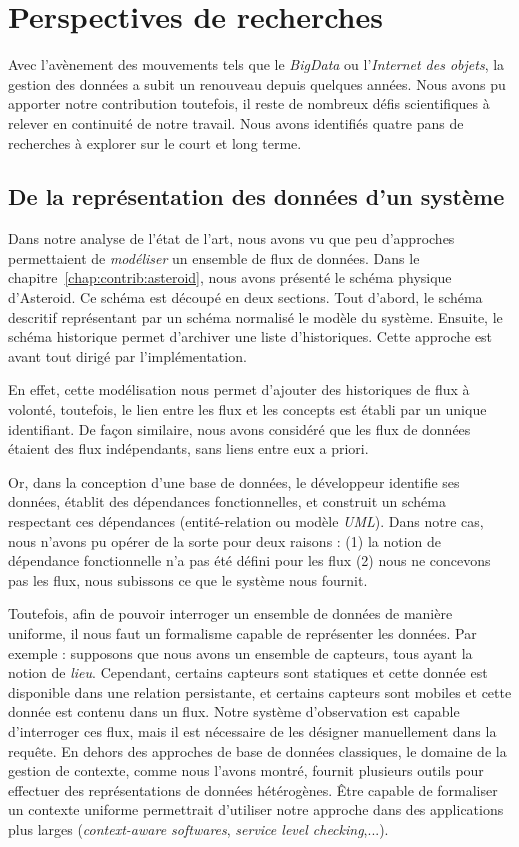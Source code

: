 \section{Perspectives de recherches}\label{sec:conclusion:perspectives}
Avec l'avènement des mouvements tels que le \textit{BigData} ou l'\textit{Internet des objets}, la gestion des données a subit un renouveau depuis quelques années. Nous avons pu apporter notre contribution toutefois, il reste de nombreux défis scientifiques à relever en continuité de notre travail. Nous avons identifiés quatre pans de recherches à explorer sur le court et long terme.

\subsection{De la représentation des données d'un système}
Dans notre analyse de l'état de l'art, nous avons vu que peu d'approches permettaient de \textit{modéliser} un ensemble de flux de données. Dans le chapitre~\ref{chap:contrib:asteroid}, nous avons présenté le schéma physique d'Asteroid. Ce schéma est découpé en deux sections. Tout d'abord, le schéma descritif représentant par un schéma normalisé le modèle du système. Ensuite, le schéma historique permet d'archiver une liste d'historiques. Cette approche est avant tout dirigé par l'implémentation.

En effet, cette modélisation nous permet d'ajouter des historiques de flux à volonté, toutefois, le lien entre les flux et les concepts est établi par un unique identifiant. De façon similaire, nous avons considéré que les flux de données étaient des flux indépendants, sans liens entre eux a priori.

Or, dans la conception d'une base de données, le développeur identifie ses données, établit des dépendances fonctionnelles, et construit un schéma respectant ces dépendances (entité-relation ou modèle \textit{UML}). Dans notre cas, nous n'avons pu opérer de la sorte pour deux raisons : (1) la notion de dépendance fonctionnelle n'a pas été défini pour les flux (2) nous ne concevons pas les flux, nous subissons ce que le système nous fournit.

Toutefois, afin de pouvoir interroger un ensemble de données de manière uniforme, il nous faut un formalisme capable de représenter les données. Par exemple : supposons que nous avons un ensemble de capteurs, tous ayant la notion de \textit{lieu}. Cependant, certains capteurs sont statiques et cette donnée est disponible dans une relation persistante, et certains capteurs sont mobiles et cette donnée est contenu dans un flux. Notre système d'observation est capable d'interroger ces flux, mais il est nécessaire de les désigner manuellement dans la requête. En dehors des approches de base de données classiques, le domaine de la gestion de contexte, comme nous l'avons montré, fournit plusieurs outils pour effectuer des représentations de données hétérogènes. Être capable de formaliser un contexte uniforme permettrait d'utiliser notre approche dans des applications plus larges (\textit{context-aware softwares}, \textit{service level checking},...).

